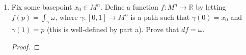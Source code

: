\documentclass{article}
\begin{document}
\begin{enumerate}[label={\bf Q\arabic*:}]
\begin{enumerate}
\begin{proof}
          Then $\gamma$ is a smooth path, even at $t=1$, because from
          our choice of $h$, there will be an open interval containing
          $t=1$ where $\gamma$ is constant. Furthurmore, $\gamma$ is a
          closed path, so from assumption $\int_\gamma\omega=0$. Now
          \begin{align*}
            0 &=\int_\gamma\omega \\
              &=\int_{\gamma_1\circ h}\omega - \int_{\gamma_2\circ h}\omega
                \\
              &=\int_{\gamma_1}\omega - \int_{\gamma_2}\omega &(\text{from
                Question 1}), \\
          \end{align*}
          and so $\int_{\gamma_1}\omega=\int_{\gamma_2}\omega$ as required.
        \end{proof}

      \item Fix some basepoint $x_0\in M^n$. Define a function
        $f:M^n\rightarrow\mathbb{R}$ by letting $f(p)=\int_\gamma\omega$,
        where $\gamma:[0,1]\rightarrow M^n$ is a path such that
        $\gamma(0)=x_0$ and $\gamma(1)=p$ (this is well-defined by part a).
        Prove that $df=\omega$.

        \begin{proof}
        \end{proof}
    \end{enumerate}
\end{enumerate}
\end{document}
